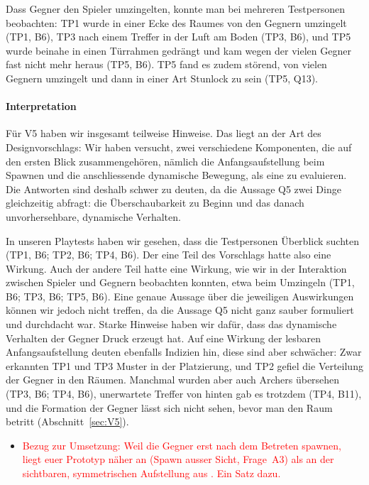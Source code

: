 \documentclass[../Main.tex]{subfiles}
\begin{document}
Dass Gegner den Spieler umzingelten, konnte man bei mehreren Testpersonen beobachten: TP1 wurde in einer Ecke des Raumes von den Gegnern umzingelt (TP1, B6), TP3 nach einem Treffer in der Luft am Boden (TP3, B6), und TP5 wurde beinahe in einen Türrahmen gedrängt und kam wegen der vielen Gegner fast nicht mehr heraus (TP5, B6). TP5 fand es zudem störend, von vielen Gegnern umzingelt und dann in einer Art Stunlock zu sein (TP5, Q13).

\paragraph{Interpretation}
Für V5 haben wir insgesamt teilweise Hinweise. Das liegt an der Art des Designvorschlags: Wir haben versucht, zwei verschiedene Komponenten, die auf den ersten Blick zusammengehören, nämlich die Anfangsaufstellung beim Spawnen und die anschliessende dynamische Bewegung, als eine zu evaluieren. Die Antworten sind deshalb schwer zu deuten, da die Aussage Q5 zwei Dinge gleichzeitig abfragt: die Überschaubarkeit zu Beginn und das danach unvorhersehbare, dynamische Verhalten.

In unseren Playtests haben wir gesehen, dass die Testpersonen Überblick suchten (TP1, B6; TP2, B6; TP4, B6). Der eine Teil des Vorschlags hatte also eine Wirkung. Auch der andere Teil hatte eine Wirkung, wie wir in der Interaktion zwischen Spieler und Gegnern beobachten konnten, etwa beim Umzingeln (TP1, B6; TP3, B6; TP5, B6). Eine genaue Aussage über die jeweiligen Auswirkungen können wir jedoch nicht treffen, da die Aussage Q5 nicht ganz sauber formuliert und durchdacht war. Starke Hinweise haben wir dafür, dass das dynamische Verhalten der Gegner Druck erzeugt hat. Auf eine Wirkung der lesbaren Anfangsaufstellung deuten ebenfalls Indizien hin, diese sind aber schwächer: Zwar erkannten TP1 und TP3 Muster in der Platzierung, und TP2 gefiel die Verteilung der Gegner in den Räumen. Manchmal wurden aber auch Archers übersehen (TP3, B6; TP4, B6), unerwartete Treffer von hinten gab es trotzdem (TP4, B11), und die Formation der Gegner lässt sich nicht sehen, bevor man den Raum betritt (Abschnitt~\ref{sec:V5}).

\begin{itemize}[leftmargin=1.5cm]
    \item \textcolor{red}{Bezug zur Umsetzung: Weil die Gegner erst nach dem Betreten spawnen, liegt euer Prototyp näher an  (Spawn ausser Sicht, Frage~A3) als an der sichtbaren, symmetrischen Aufstellung aus . Ein Satz dazu.}
\end{itemize}
\end{document}
